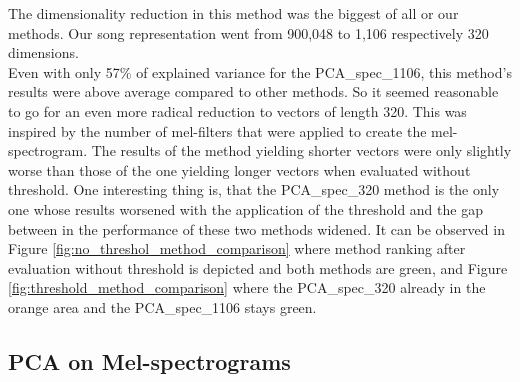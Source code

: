 The dimensionality reduction in this method was the biggest of all or our methods. Our song representation went from 900,048 to 1,106 respectively 320 dimensions. \\
Even with only 57\% of explained variance for the PCA\_spec\_1106, this method's results were above average compared to other methods. So it seemed reasonable to go for an even more radical reduction to vectors of length 320. This was inspired by the number of mel-filters that were applied to create the mel-spectrogram. The results of the method yielding shorter vectors were only slightly worse than those of the one yielding longer vectors when evaluated without threshold. One interesting thing is, that the PCA\_spec\_320 method is the only one whose results worsened with the application of the threshold and the gap between in the performance of these two methods widened. It can be observed in Figure \ref{fig:no_threshol_method_comparison} where method ranking after evaluation without threshold is depicted and both methods are green, and Figure \ref{fig:threshold_method_comparison} where the PCA\_spec\_320 already in the orange area and the PCA\_spec\_1106 stays green. \\

\subsection{PCA on Mel-spectrograms}\label{ssec:pca_mel_results}

